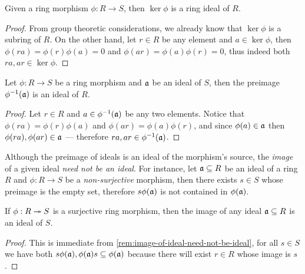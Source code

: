 \begin{corollary}
\label{cor:kernel-is-ideal}
Given a ring morphism \(\phi: R \to S\), then \(\ker \phi\) is a ring ideal of
\(R\).
\end{corollary}

\begin{proof}
From group theoretic considerations, we already know that \(\ker \phi\) is a
subring of \(R\). On the other hand, let \(r \in R\) be any element and \(a \in
\ker \phi\), then \(\phi(r a) = \phi(r) \phi(a) = 0\) and \(\phi(a r) = \phi(a)
\phi(r) = 0\), thus indeed both \(r a, a r \in \ker \phi\).
\end{proof}

\begin{corollary}
\label{cor:inverse-image-of-ideal-is-ideal}
Let \(\phi: R \to S\) be a ring morphism and \(\mathfrak{a}\) be an ideal of \(S\),
then the preimage \(\phi^{-1}(\mathfrak{a})\) is an ideal of \(R\).
\end{corollary}

\begin{proof}
Let \(r \in R\) and \(a \in \phi^{-1}(\mathfrak{a})\) be any two elements. Notice
that \(\phi(r a) = \phi(r) \phi(a)\) and \(\phi(a r) = \phi(a) \phi(r)\), and
since \(\phi(a) \in \mathfrak{a}\) then \(\phi(r a), \phi(a r) \in \mathfrak{a}\) ---
therefore \(r a, a r \in \phi^{-1}(\mathfrak{a})\).
\end{proof}

\begin{remark}
\label{rem:image-of-ideal-need-not-be-ideal}
Although the preimage of ideals is an ideal of the morphism's source, the
\emph{image} of a given ideal \emph{need not be an ideal}. For instance, let
\(\mathfrak{a} \subseteq R\) be an ideal of a ring \(R\) and \(\phi: R \to S\) be a
\emph{non-surjective} morphism, then there exists \(s \in S\) whose preimage is
the empty set, therefore \(s \phi(\mathfrak{a})\) is not contained in
\(\phi(\mathfrak{a})\).
\end{remark}

\begin{corollary}
\label{cor:surjective-preserve-ideals}
If \(\phi: R \twoheadrightarrow S\) is a surjective ring morphism, then the image of any ideal
\(\mathfrak{a} \subseteq R\) is an ideal of \(S\).
\end{corollary}

\begin{proof}
This is immediate from \cref{rem:image-of-ideal-need-not-be-ideal}, for all \(s
\in S\) we have both \(s \phi(\mathfrak{a}), \phi(\mathfrak{a}) s \subseteq
\phi(\mathfrak{a})\) because there will exist \(r \in R\) whose image is \(s\).
\end{proof}

